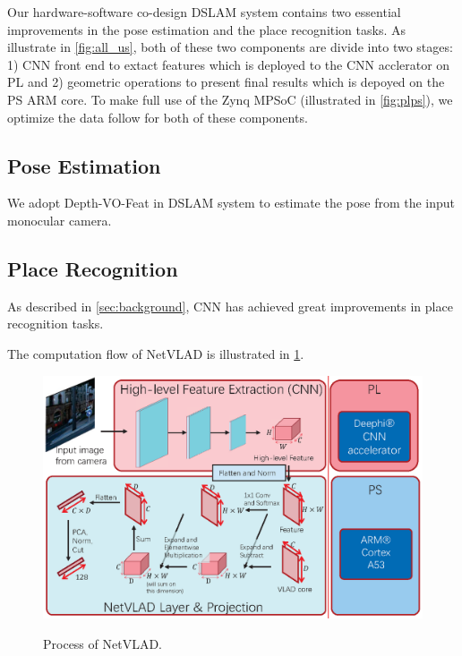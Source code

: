 \label{sec:hardsoft}
Our hardware-software co-design DSLAM system contains two essential improvements in the pose estimation and the place recognition tasks. As illustrate in \cref{fig:all_us}, both of these two components are divide into two stages: 1) CNN front end to extact features which is deployed to the CNN acclerator on PL and 2) geometric operations to present final results which is depoyed on the PS ARM core. To make full use of the Zynq MPSoC (illustrated in \cref{fig:plps}), we optimize the data follow for both of these components.

\subsection{Pose Estimation}
We adopt Depth-VO-Feat \cite{Zhan:2018e92} in DSLAM system to estimate the pose from the input monocular camera.

\subsection{Place Recognition}
As described in \cref{sec:background}, CNN has achieved great improvements in place recognition tasks.

The computation flow of NetVLAD is illustrated in \cref{fig:NetVLAD}.

\begin{figure}[t]
    \centering  
    {\includegraphics[width=0.85\linewidth]{fig/NetVLAD.eps}\label{fig:NetVLAD}} 
    \caption{Process of NetVLAD.}
\end{figure}
